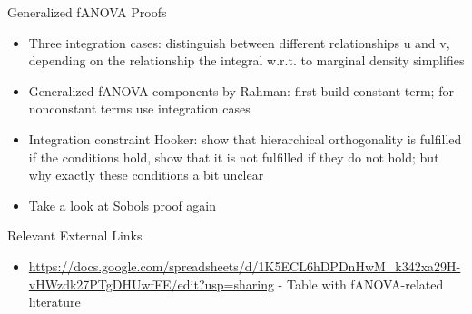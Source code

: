 \begin{frame}{Generalized fANOVA Proofs}
    \begin{itemize}
        \item Three integration cases: distinguish between different relationships u and v, depending on the relationship the integral w.r.t. to marginal density simplifies
        \item Generalized fANOVA components by Rahman: first build constant term; for nonconstant terms use integration cases
        \item Integration constraint Hooker: show that hierarchical orthogonality is fulfilled if the conditions hold, show that it is not fulfilled if they do not hold; but why exactly these conditions a bit unclear
        \item Take a look at Sobols proof again
    \end{itemize}
\end{frame}

\begin{frame}{Relevant External Links}
    \begin{itemize}
        \item \url{https://docs.google.com/spreadsheets/d/1K5ECL6hDPDnHwM_k342xa29H-vHWzdk27PTgDHUwfFE/edit?usp=sharing} - Table with fANOVA-related literature
    \end{itemize}
\end{frame}